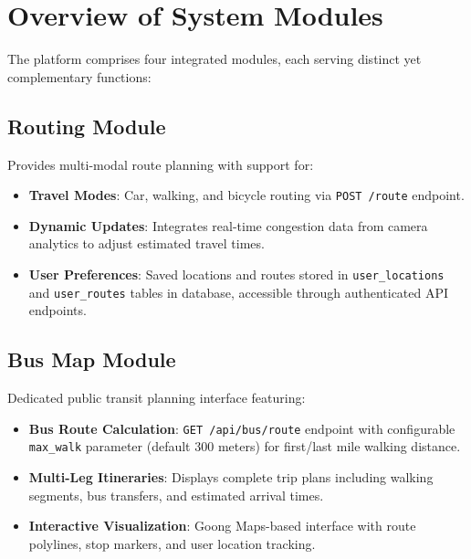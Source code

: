 \section{Overview of System Modules}

The platform comprises four integrated modules, each serving distinct yet complementary functions:

\subsection{Routing Module}
Provides multi-modal route planning with support for:
\begin{itemize}
    \item \textbf{Travel Modes}: Car, walking, and bicycle routing via \texttt{POST /route} endpoint.
    \item \textbf{Dynamic Updates}: Integrates real-time congestion data from camera analytics to adjust estimated travel times.
    \item \textbf{User Preferences}: Saved locations and routes stored in \texttt{user\_locations} and \texttt{user\_routes} tables in database, accessible through authenticated API endpoints.
\end{itemize}

\subsection{Bus Map Module}
Dedicated public transit planning interface featuring:
\begin{itemize}
    \item \textbf{Bus Route Calculation}: \texttt{GET /api/bus/route} endpoint with configurable \texttt{max\_walk} parameter (default 300 meters) for first/last mile walking distance.
    \item \textbf{Multi-Leg Itineraries}: Displays complete trip plans including walking segments, bus transfers, and estimated arrival times.
    \item \textbf{Interactive Visualization}: Goong Maps-based interface with route polylines, stop markers, and user location tracking.
\end{itemize}


